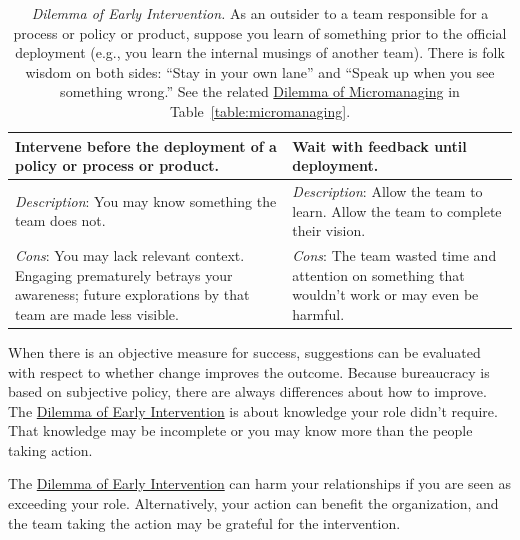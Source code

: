 \begin{center}
\begin{table}[H] %
\begin{tabular}{ | m{\dilemmatablewidth}| m{\dilemmatablewidth} | } 
  \hline
  \textbf{Intervene before the deployment of a policy or process or product.} &
  \textbf{Wait with feedback until deployment.} \\
  \hline
  \textit{Description}: You may know something the team does not. & 
  \textit{Description}: Allow the team to learn. Allow the team to complete their vision. \\
  \hline
  \textit{Cons}: You may lack relevant context. Engaging prematurely betrays your awareness; future explorations by that team are made less visible. & 
  \textit{Cons}: The team wasted time and attention on something that wouldn't work or may even be harmful. \\
  \hline
\end{tabular}
\caption{
\textit{Dilemma of Early Intervention.}
As an outsider to a team responsible for a process or policy or product, suppose you learn of something prior to the official deployment (e.g., you learn the internal musings of another team). There is folk wisdom on both sides: 
``Stay in your own lane'' 
and 
``Speak up when you see something wrong.''
See the related \hyperref[table:micromanaging]{Dilemma of Micromanaging} in Table~\ref{table:micromanaging}.}
\label{table:early-intervention}
\end{table}
\end{center}

When there is an objective measure for success, suggestions can be evaluated with respect to whether change improves the outcome. Because bureaucracy is based on subjective policy, there are always differences about how to improve. The \hyperref[table:early-intervention]{Dilemma of Early Intervention} is about knowledge your role didn't require. That knowledge may be incomplete or you may know more than the people taking action. 


The \hyperref[table:early-intervention]{Dilemma of Early Intervention} can harm your relationships if you are seen as exceeding your role. Alternatively, your action can benefit the organization, and the team taking the action may be grateful for the intervention. 


